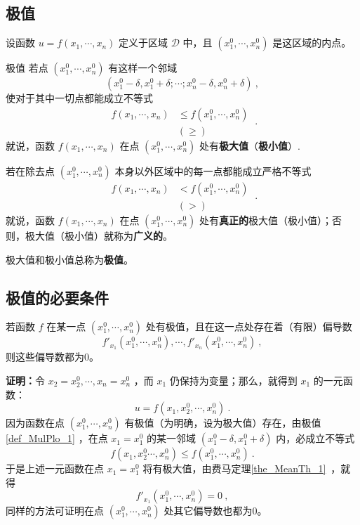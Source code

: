 
\subsection{极值}
设函数 $u=f(x_1,\cdots,x_n)$ 定义于区域 $\mathcal{D}$ 中，且 $(x_1^0,\cdots,x_n^0)$ 是这区域的内点。

\begin{definition}{极值}\label{def_MulPlo_1}
若点 $(x_1^0,\cdots,x_n^0)$ 有这样一个邻域
\[(x_1^0-\delta,x_1^0+\delta;\cdots;x_n^0-\delta,x_n^0+\delta)~,\]
使对于其中一切点都能成立不等式
\begin{equation}
\begin{aligned}
f(x_1,\cdots,x_n)&\leq f(x_1^0,\cdots,x_n^0)\\
&(\geq)
\end{aligned}~.
\end{equation}
就说，函数 $f(x_1,\cdots,x_n)$ 在点 $(x_1^0,\cdots,x_n^0)$ 处有\textbf{极大值}（\textbf{极小值}）.

若在除去点 $(x_1^0,\cdots,x_n^0)$ 本身以外区域中的每一点都能成立严格不等式
\begin{equation}
\begin{aligned}
f(x_1,\cdots,x_n)&< f(x_1^0,\cdots,x_n^0)\\
&(>)
\end{aligned}~.
\end{equation}
就说，函数 $f(x_1,\cdots,x_n)$ 在点 $(x_1^0,\cdots,x_n^0)$ 处有\textbf{真正的}极大值（极小值）；否则，极大值（极小值）就称为\textbf{广义的}。

极大值和极小值总称为\textbf{极值}。
\end{definition}
\subsection{极值的必要条件}
\begin{theorem}{}
若函数 $f$ 在某一点 $(x_1^0,\cdots,x_n^0)$ 处有极值，且在这一点处存在着（有限）偏导数
\[f'_{x_1}(x_1^0,\cdots,x_n^0),\cdots,f'_{x_n}(x_1^0,\cdots,x_n^0)~,\]
则这些偏导数都为0。
\end{theorem}
\textbf{证明：}令 $x_2=x_2^0,\cdots,x_n=x_n^0$ ，而 $x_1$ 仍保持为变量；那么，就得到 $x_1$ 的一元函数：
\begin{equation}
u=f(x_1,x_2^0,\cdots,x_n^0)~.
\end{equation}
因为函数在点 $(x_1^0,\cdots,x_n^0)$ 有极值（为明确，设为极大值）存在，由极值\autoref{def_MulPlo_1} ，在点 $x_1=x_1^0$ 的某一邻域 $(x_1^0-\delta,x_1^0+\delta)$ 内，必成立不等式
\begin{equation}
f(x_1,x_2^0\cdots,x_n^0)\leq f(x_1^0,\cdots,x_n^0)~.
\end{equation}
于是上述一元函数在点 $x_1=x_1^0$ 将有极大值，由费马定理\autoref{the_MeanTh_1}~，就得
\begin{equation}
f'_{x_1}(x_1^0,\cdots,x_n^0)=0~,
\end{equation}
同样的方法可证明在点 $(x_1^0,\cdots,x_n^0)$ 处其它偏导数也都为0。


